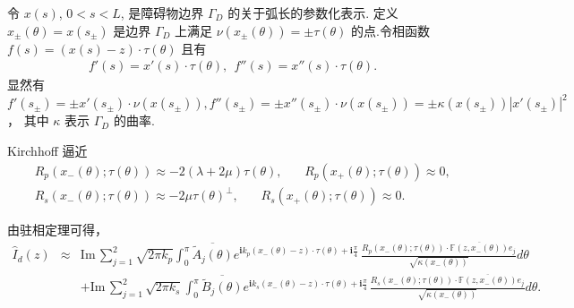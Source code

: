 \documentclass[8pt]{beamer}
\renewcommand{\i}{\mathbf{i}}
\renewcommand{\Im}{\mathrm{Im}\,}
\newcommand{\Ga}{\Gamma}
\newcommand{\lam}{\lambda}
\renewcommand{\i}{\mathbf{i}}
\renewcommand{\Im}{\mathrm{Im}\,}
\newcommand{\F}{\mathbb{F}}
\newcommand{\ben}{\begin{eqnarray*}}
\newcommand{\een}{\end{eqnarray*}}
\begin{document}
\begin{frame}
令 $x(s)$, $0<s<L$, 是障碍物边界 $\Ga_D$ 的关于弧长的参数化表示. 定义 $x_{\pm}(\theta)=x(s_\pm)$ 是边界 $\Ga_D$ 上满足 $\nu(x_\pm(\theta))=\pm\tau(\theta)$ 的点.令相函数 $f(s)= (x(s)-z)\cdot\tau(\theta)$ 且有 
\ben
f'(s)=x'(s)\cdot\tau(\theta),  \ \ f''(s)=x''(s) \cdot\tau(\theta).
\een
显然有 $f'(s_\pm)=\pm x'(s_\pm)\cdot\nu(x(s_\pm)), f''(s_\pm)=\pm x''(s_\pm)\cdot \nu(x(s_\pm))= \pm\kappa(x(s_\pm))|x'(s_\pm)|^2$， 其中 $\kappa$ 表示 $\Ga_D$ 的曲率.
\begin{block}{Kirchhoff 逼近}
\ben\label{sc5}
& &R_p(x_-(\theta);\tau(\theta))\approx-2(\lam+2\mu)\tau(\theta),\ \ \ \ \ \ \ \ R_p(x_+(\theta);\tau(\theta))\approx0,\\ 
 & &R_s(x_-(\theta);\tau(\theta))\approx-2\mu\tau(\theta)^\perp,\ \ \ \ \ \ \ \ R_s(x_+(\theta);\tau(\theta))\approx0.
\een
\end{block}
由驻相定理可得，
\ben
\hat I_d(z)&\approx&\Im\sum^2_{j=1}\sqrt{2\pi k_p}
\int^\pi_0\overline{\tilde A_j(\theta)}e^{\i k_p(x_-(\theta)-z)\cdot\tau(\theta)+\i\frac\pi 4}\,\frac{R_p(x_-(\theta);\tau(\theta))\cdot\overline{\F(z,x_-(\theta))}e_j}{\sqrt{\kappa(x_-(\theta))}}d\theta\\
& &+\Im\sum^2_{j=1}\sqrt{2\pi k_s}
\int^\pi_0\overline{\tilde B_j(\theta)}e^{\i k_s(x_-(\theta)-z)\cdot\tau(\theta)+\i\frac\pi 4\,}\frac{R_s(x_-(\theta);\tau(\theta))
	\cdot\overline{\F(z,x_-(\theta))}e_j}{\sqrt{\kappa(x_-(\theta))}}d\theta.
\een

\end{frame}
\end{document}
